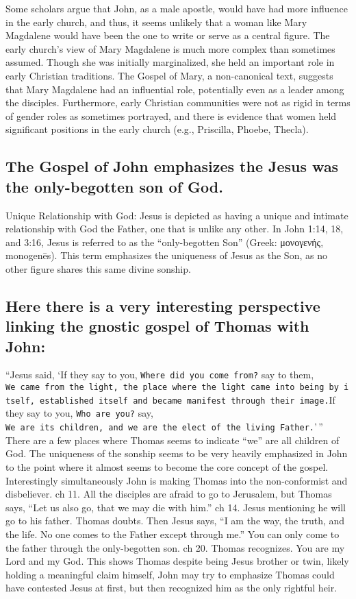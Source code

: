Some scholars argue that John, as a male apostle, would have had more influence in the early church, and thus, it seems unlikely that a woman like Mary Magdalene would have been the one to write or serve as a central figure.
The early church's view of Mary Magdalene is much more complex than sometimes assumed.
Though she was initially marginalized, she held an important role in early Christian traditions.
The Gospel of Mary, a non-canonical text, suggests that Mary Magdalene had an influential role, potentially even as a leader among the disciples.
Furthermore, early Christian communities were not as rigid in terms of gender roles as sometimes portrayed, and there is evidence that women held significant positions in the early church (e.g., Priscilla, Phoebe, Thecla).

\subsection{The Gospel of John emphasizes the Jesus was the only-begotten son of God.}\label{subsec:the-gospel-of-john-emphasizes-the-jesus-was-the-only-begotten-son-of-god.}

Unique Relationship with God: Jesus is depicted as having a unique and intimate relationship with God the Father, one that is unlike any other.
In John 1:14, 18, and 3:16, Jesus is referred to as the ``only-begotten Son'' (Greek: μονογενής, monogenēs).
This term emphasizes the uniqueness of Jesus as the Son, as no other figure shares this same divine sonship.

\subsection{Here there is a very interesting perspective linking the gnostic gospel of Thomas with John:}\label{subsec:here-there-is-a-very-interesting-perspective-linking-the-gnostic-gospel-of-thomas-with-john}

``Jesus said, `If they say to you, \texttt{Where\ did\ you\ come\ from?} say to them, \texttt{We\ came\ from\ the\ light,\ the\ place\ where\ the\ light\ came\ into\ being\ by\ itself,\ established\ itself\ and\ became\ manifest\ through\ their\ image.}If they say to you, \texttt{Who\ are\ you?} say, \texttt{We\ are\ its\ children,\ and\ we\ are\ the\ elect\ of\ the\ living\ Father.}'\,'' There are a few places where Thomas seems to indicate ``we'' are all children of God.
The uniqueness of the sonship seems to be very heavily emphasized in John to the point where it almost seems to become the core concept of the gospel.
Interestingly simultaneously John is making Thomas into the non-conformist and disbeliever.
ch 11.
All the disciples are afraid to go to Jerusalem, but Thomas says, ``Let us also go, that we may die with him.'' ch 14.
Jesus mentioning he will go to his father.
Thomas doubts.
Then Jesus says, ``I am the way, the truth, and the life.
No one comes to the Father except through me.'' You can only come to the father through the only-begotten son.
ch 20.
Thomas recognizes.
You are my Lord and my God.
This shows Thomas despite being Jesus brother or twin, likely holding a meaningful claim himself, John may try to emphasize Thomas could have contested Jesus at first, but then recognized him as the only rightful heir.

